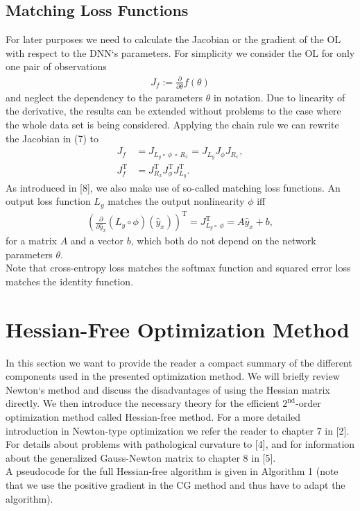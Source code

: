 \documentclass[conference]{IEEEtran}
\begin{document}
	\subsection{Matching Loss Functions}
	\noindent
	For later purposes we need to calculate the Jacobian or the gradient of the OL with respect to the DNN`s parameters. For simplicity we consider the OL for only one pair of observations
	\begin{align}
	J_{f} := \frac{\partial}{\partial\theta}f(\theta)
	\end{align}
	and neglect the dependency to the parameters $\theta$ in notation.
	Due to linearity of the derivative, the results can be extended without problems to the case where the whole data set is being considered.
	Applying the chain rule we can rewrite the Jacobian in (7) to
	\begin{align}
	J_{f} &= J_{L_{y}\circ \:\phi \:\circ\:R_{x}} = J_{L_{y}} J_{\phi} J_{R_{x}},\\
	J_{f}^{\mathrm{T}} &= J_{R_{x}}^{\mathrm{T}}  J_{\phi}^{\mathrm{T}}  J_{L_{y}}^{\mathrm{T}}.
	\end{align}
	As introduced in [8], we also make use of so-called matching loss functions. An output loss function $L_{y}$ matches the output nonlinearity $\phi$ iff
	\begin{align}
	\left(\frac{\partial}{\partial\hat{y}_{x}}\left(L_{y}\circ \phi\right)(\hat{y}_{x})\right)^{\mathrm{T}}= J_{L_{y}\circ \:\phi}^{\mathrm{T}} = A \hat{y}_{x} + b,
	\end{align}
	for a matrix $A$ and a vector $b$, which both do not depend on the network parameters $\theta$.\\
	Note that cross-entropy loss matches the softmax function and squared error loss matches the identity function.


	\section{Hessian-Free Optimization Method}
	\noindent
	In this section we want to provide the reader a compact summary of the different components used in the presented optimization method. We will briefly review Newton`s method and discuss the disadvantages of using the Hessian matrix directly. We then introduce the necessary theory for the efficient $2^{\text{nd}}$-order optimization method called Hessian-free method. For a more detailed introduction in Newton-type optimization we refer the reader to chapter 7 in [2]. For details about problems with pathological curvature to [4], and for information about the generalized Gauss-Newton matrix to chapter 8 in [5].\\
	A pseudocode for the full Hessian-free algorithm is given in Algorithm 1 (note that we use the positive gradient in the CG method and thus have to adapt the algorithm).
\end{document}
